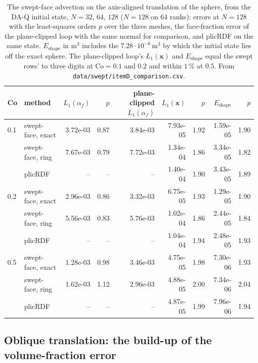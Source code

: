 \documentclass[preprint,12pt]{elsarticle}
\begin{document}
\begin{table}[htbp]
\centering
\caption{The swept-face advection on the axis-aligned translation of the sphere, from the DA-Q initial state, $N = 32$, $64$, $128$ ($N = 128$ on 64 ranks): errors at $N = 128$ with the least-squares orders $p$ over the three meshes, the face-fraction error of the plane-clipped loop with the same normal for comparison, and plicRDF on the same state. $E_{\mathrm{shape}}$ in $\mathrm{m^3}$ includes the $7.28\cdot10^{-6}\,\mathrm{m^3}$ by which the initial state lies off the exact sphere. The plane-clipped loop's $L_1(\mathbf{x})$ and $E_{\mathrm{shape}}$ equal the swept rows' to three digits at $\mathrm{Co} = 0.1$ and $0.2$ and within $1\,\%$ at $0.5$. From \texttt{data/swept/itemD\_comparison.csv}.}
\label{tab:swept-sphere}
\footnotesize
\setlength{\tabcolsep}{4pt}
\begin{tabular}{llrrrrrrr}
\toprule
Co & method & $L_1(\alpha_f)$ & $p$ & plane-clipped $L_1(\alpha_f)$ & $L_1(\mathbf{x})$ & $p$ & $E_{\mathrm{shape}}$ & $p$ \\
\midrule
0.1 & swept-face, exact & 3.72e-03 & 0.87 & 3.84e-03 & 7.93e-05 & 1.92 & 1.59e-05 & 1.90 \\
 & swept-face, ring & 7.67e-03 & 0.79 & 7.72e-03 & 1.34e-04 & 1.86 & 3.34e-05 & 1.82 \\
 & plicRDF & -- & -- & -- & 1.40e-04 & 1.90 & 3.43e-05 & 1.89 \\
0.2 & swept-face, exact & 2.96e-03 & 0.86 & 3.32e-03 & 6.75e-05 & 1.93 & 1.29e-05 & 1.90 \\
 & swept-face, ring & 5.56e-03 & 0.83 & 5.76e-03 & 1.02e-04 & 1.86 & 2.44e-05 & 1.84 \\
 & plicRDF & -- & -- & -- & 1.04e-04 & 1.94 & 2.48e-05 & 1.93 \\
0.5 & swept-face, exact & 1.28e-03 & 0.98 & 3.46e-03 & 4.75e-05 & 1.98 & 7.30e-06 & 1.93 \\
 & swept-face, ring & 1.62e-03 & 1.12 & 2.96e-03 & 4.88e-05 & 2.00 & 7.34e-06 & 2.04 \\
 & plicRDF & -- & -- & -- & 4.87e-05 & 1.99 & 7.96e-06 & 1.94 \\
\bottomrule
\end{tabular}
\end{table}

\subsection{Oblique translation: the build-up of the volume-fraction error}
\label{sec:oblique}
\end{document}
